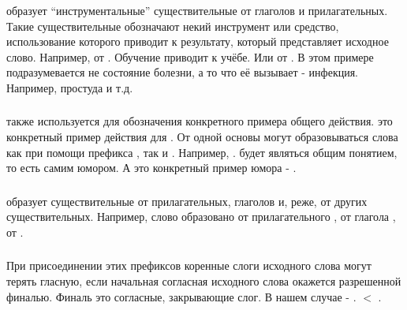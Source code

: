 \subsubsection{}  образует ``инструментальные'' существительные от глаголов и прилагательных. Такие существительные обозначают некий инструмент или средство, использование которого приводит к результату, который представляет исходное слово. Например,   от
 . Обучение приводит к учёбе. Или   от 
. В этом примере подразумевается не состояние болезни, а то что её вызывает - инфекция. Например, простуда и т.д.  

\subsubsection{}  также используется для обозначения конкретного примера общего действия.   это конкретный пример действия для  .  От одной основы могут образовываться слова как при помощи префикса , так и . Например, 
.   будет являться общим понятием, то есть самим юмором. А  это конкретный пример юмора - .\\

\subsubsection{}  образует существительные от прилагательных, глаголов и, реже, от других существительных. Например, слово   образовано от прилагательного
 ,   от глагола
 ,   от 
. 

\subsubsection{} При присоединении этих префиксов коренные слоги исходного слова могут терять гласную, если начальная согласная исходного слова окажется разрешенной финалью. Финаль это согласные, закрывающие слог. В нашем случае - . 
 $<$  .


